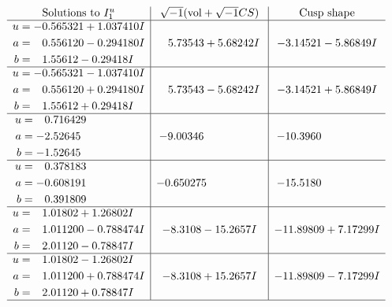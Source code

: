\documentclass[1p]{elsarticle_modified}
\theoremstyle{definition}
\newcommand{\I}{\sqrt{-1}}
\begin{document}
$$\begin{array}{c|c|c}  
\text{Solutions to }I^u_{1}& \I (\text{vol} + \sqrt{-1}CS) & \text{Cusp shape}\\
 \hline 
\begin{aligned}
u &= -0.565321 + 1.037410 I \\
a &= \phantom{-}0.556120 - 0.294180 I \\
b &= \phantom{-}1.55612 - 0.29418 I\end{aligned}
 & \phantom{-}5.73543 + 5.68242 I & -3.14521 - 5.86849 I \\ \hline\begin{aligned}
u &= -0.565321 - 1.037410 I \\
a &= \phantom{-}0.556120 + 0.294180 I \\
b &= \phantom{-}1.55612 + 0.29418 I\end{aligned}
 & \phantom{-}5.73543 - 5.68242 I & -3.14521 + 5.86849 I \\ \hline\begin{aligned}
u &= \phantom{-}0.716429\phantom{ +0.000000I} \\
a &= -2.52645\phantom{ +0.000000I} \\
b &= -1.52645\phantom{ +0.000000I}\end{aligned}
 & -9.00346\phantom{ +0.000000I} & -10.3960\phantom{ +0.000000I} \\ \hline\begin{aligned}
u &= \phantom{-}0.378183\phantom{ +0.000000I} \\
a &= -0.608191\phantom{ +0.000000I} \\
b &= \phantom{-}0.391809\phantom{ +0.000000I}\end{aligned}
 & -0.650275\phantom{ +0.000000I} & -15.5180\phantom{ +0.000000I} \\ \hline\begin{aligned}
u &= \phantom{-}1.01802 + 1.26802 I \\
a &= \phantom{-}1.011200 - 0.788474 I \\
b &= \phantom{-}2.01120 - 0.78847 I\end{aligned}
 & -8.3108 - 15.2657 I & -11.89809 + 7.17299 I \\ \hline\begin{aligned}
u &= \phantom{-}1.01802 - 1.26802 I \\
a &= \phantom{-}1.011200 + 0.788474 I \\
b &= \phantom{-}2.01120 + 0.78847 I\end{aligned}
 & -8.3108 + 15.2657 I & -11.89809 - 7.17299 I\\
 \hline 
 \end{array}$$\newpage\newpage\renewcommand{\arraystretch}{1}
\end{document}
